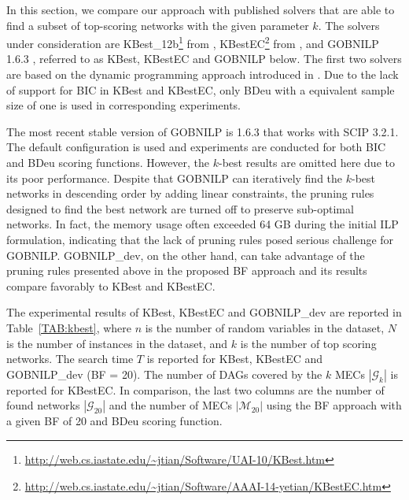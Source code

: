 \documentclass[letterpaper]{article}
\newcommand{\graphset}{\mathcal{G}}
\newcommand{\gobnilp}{GOBNILP}
\begin{document}
In this section, we compare our approach with published solvers that are able to find a subset of top-scoring networks with the given parameter $k$. The solvers under consideration are KBest\_12b\footnote{\url{http://web.cs.iastate.edu/~jtian/Software/UAI-10/KBest.htm}} from \cite{TianHR10}, KBestEC\footnote{\url{http://web.cs.iastate.edu/~jtian/Software/AAAI-14-yetian/KBestEC.htm}} from \cite{ChenT2014}, and GOBNILP 1.6.3
\cite{BartlettC13}, referred to as KBest, KBestEC and GOBNILP below. The first two solvers are based on the dynamic programming approach introduced in \cite{SilanderM06}.
Due to the lack of support for BIC in KBest and KBestEC, only BDeu with a equivalent sample size of one is used in corresponding experiments.

The most recent stable version of \gobnilp{} is 1.6.3 that works with SCIP 3.2.1. The default configuration is used and experiments are conducted for both BIC and BDeu scoring functions. However, the $k$-best results are omitted here due to its poor performance. Despite that \gobnilp{} can iteratively find the $k$-best networks in descending order by adding linear constraints, the pruning rules designed to find the best network are turned off to preserve sub-optimal networks. In fact, the memory usage often exceeded 64 GB during the initial ILP formulation, indicating that the lack of pruning rules posed serious challenge for GOBNILP. \gobnilp{\_dev}, on the other hand, can take advantage of the pruning rules presented above in the proposed BF approach and its results compare favorably to KBest and KBestEC.

The experimental results of KBest, KBestEC and \gobnilp{\_dev} are reported in Table~\ref{TAB:kbest}, where $n$ is the number of random variables in the dataset, $N$ is the number of instances in the dataset, and $k$ is the number of top scoring networks. The search time $T$ is reported for KBest, KBestEC and GOBNILP\_dev (BF = 20). The number of DAGs covered by the $k$ MECs $|\graphset_k|$ is reported for KBestEC. In comparison, the last two columns are the number of found networks $|\graphset_{20}|$ and the number of MECs $|\mathcal{M}_{20}|$ using the BF approach with a given BF of 20 and BDeu scoring function.
\end{document}
